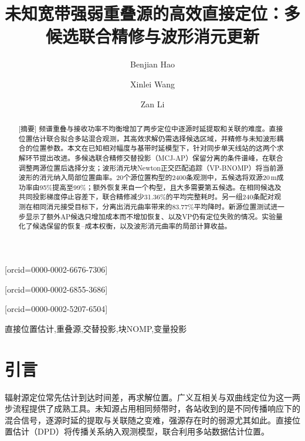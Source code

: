 \documentclass[a4paper,fleqn]{cas-sc}
\begin{document}
\let\WriteBookmarks\relax
{}
\title[mode=title]{未知宽带强弱重叠源的高效直接定位：多候选联合精修与波形消元更新}
\author[inst1]{Benjian Hao}[orcid=0000-0002-6676-7306]
\author[inst1]{Xinlei Wang}[orcid=0000-0002-6855-3686]
\author[inst1]{Zan Li}[orcid=0000-0002-5207-6504]
\cormark[1]
\begin{abstract}[摘要]
频谱重叠与接收功率不均衡增加了两步定位中逐源时延提取和关联的难度。直接位置估计联合拟合多站混合观测，其高效求解仍需选择候选区域，并精修与未知波形耦合的位置参数。本文在已知相对幅度与基带时延模型下，针对同步单天线站的这两个求解环节提出改进。多候选联合精修交替投影（MCJ-AP）保留分离的条件谱峰，在联合调整两源位置后选择分支；波形消元块Newton正交匹配追踪（VP-BNOMP）将当前源波形的消元纳入局部位置曲率。20个源位置构型的2400条观测中，五候选将双源20\,m成功率由95\%提高至99\%；额外恢复来自一个构型，且大多需要第五候选。在相同候选及共同投影梯度停止容差下，联合精修减少31.36\%的平均完整耗时。另一组240条配对观测在相同消元接受目标下，分离出消元曲率带来的83.77\%平均降时。新源位置测试进一步显示了额外AP候选只增加成本而不增加恢复、以及VP仍有定位失败的情况。实验量化了候选保留的恢复--成本权衡，以及波形消元曲率的局部计算收益。
\end{abstract}
\begin{keywords}[关键词]
直接位置估计\sep 重叠源\sep 交替投影\sep 块NOMP\sep 变量投影
\end{keywords}
\maketitle

\FloatBarrier
\section{引言}
辐射源定位常先估计到达时间差，再求解位置。广义互相关与双曲线定位为这一两步流程提供了成熟工具\cite{KnappCarter1976,ChanHo1994}。未知源占用相同频带时，各站收到的是不同传播响应下的混合信号，逐源时延的提取与关联随之变难，强源存在时的弱源尤其如此。直接位置估计（DPD）将传播关系纳入观测模型，联合利用多站数据估计位置\cite{ChenHudsonYao2002,WeissAmar2005}。
\end{document}
